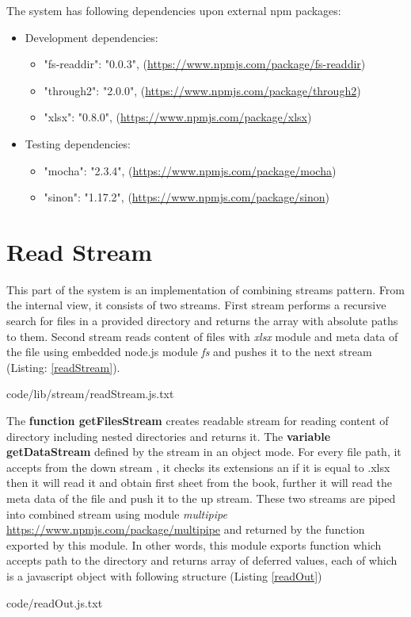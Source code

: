 The system has following dependencies upon external npm packages:
\begin{itemize}
	\item Development dependencies:
	\begin{itemize}
		\item  "fs-readdir": "0.0.3", (\url{https://www.npmjs.com/package/fs-readdir})
		\item "through2": "2.0.0", (\url{https://www.npmjs.com/package/through2})
		\item "xlsx": "0.8.0", (\url{https://www.npmjs.com/package/xlsx})
	\end{itemize}
	\item Testing dependencies:
	\begin{itemize}
		\item "mocha": "2.3.4", (\url{https://www.npmjs.com/package/mocha})
		\item "sinon": "1.17.2", (\url{https://www.npmjs.com/package/sinon})
	\end{itemize}



\end{itemize}

\section{Read Stream}
\label{sec:read}
This part of the system is an implementation of combining streams pattern. From the internal view, it consists of two streams. First stream performs a recursive search for files in a provided directory and returns the array with absolute paths to them. Second stream reads content of files with \textit{xlsx} module and meta data of the file using embedded node.js module \textit{fs} and pushes it to the next stream (Listing: \ref{readStream}).


{code/lib/stream/readStream.js.txt}

The \textbf{function getFilesStream} creates readable stream for reading content of directory including nested directories and returns it. 
The \textbf{variable getDataStream} defined by the stream in an object mode. For every file path, it accepts from the down stream , it checks its extensions an if it is equal to .xlsx then it will read it and obtain first sheet from the book, further it will read the meta data of the file and push it to the up stream.
These two streams are piped into combined stream using module \textit{multipipe} \url{https://www.npmjs.com/package/multipipe} and returned by the function exported by this module.
In other words, this module exports function which accepts path to the directory and returns array of deferred values, each of which is a javascript object with following structure (Listing \ref{readOut})

{code/readOut.js.txt}

